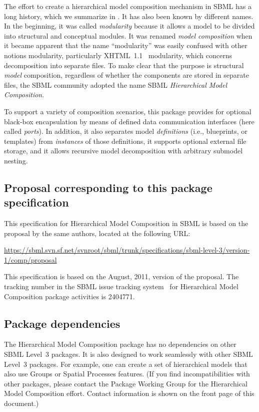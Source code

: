 The effort to create a hierarchical model composition mechanism in SBML
has a long history, which we summarize in .  It has
also been known by different names.  In the beginning, it was called
\emph{modularity} because it allows a model to be divided into
structural and conceptual modules.  It was renamed \emph{model
  composition} when it became apparent that the name ``modularity'' was
easily confused with other notions modularity, particularly
XHTML~1.1~\citep{xhtml} modularity, which concerns decomposition into
separate files.  To make clear that the purpose is structural
\emph{model} composition, regardless of whether the components are
stored in separate files, the SBML community adopted the name SBML
\emph{Hierarchical Model Composition}.

To support a variety of composition scenarios, this package provides for
optional black-box encapsulation by means of defined data communication
interfaces (here called \emph{ports}).  In addition, it also separates
model \emph{definitions} (i.e., blueprints, or templates) from
\emph{instances} of those definitions, it supports optional external
file storage, and it allows recursive model decomposition with arbitrary
submodel nesting.


\subsection{Proposal corresponding to this package specification}

This specification for Hierarchical Model Composition in SBML is based on the proposal by the same authors, located at the following URL:

\begin{center}
  \vspace*{1ex}\small
  \url{https://sbml.svn.sf.net/svnroot/sbml/trunk/specifications/sbml-level-3/version-1/comp/proposal}
  \vspace*{1ex}
\end{center}

This specification is based on the August, 2011, version of the
proposal.  The tracking number in the SBML issue tracking
system~\citep{tracker} for Hierarchical Model Composition package
activities is 2404771.


\subsection{Package dependencies}

The Hierarchical Model Composition package has no dependencies on other
SBML Level~3 packages.  It is also designed to work seamlessly with
other SBML Level~3 packages.  For example, one can create a set of
hierarchical models that also use Groups or Spatial Processes features.
(If you find incompatibilities with other packages, please contact the
Package Working Group for the Hierarchical Model Composition effort.
Contact information is shown on the front page of this document.)


